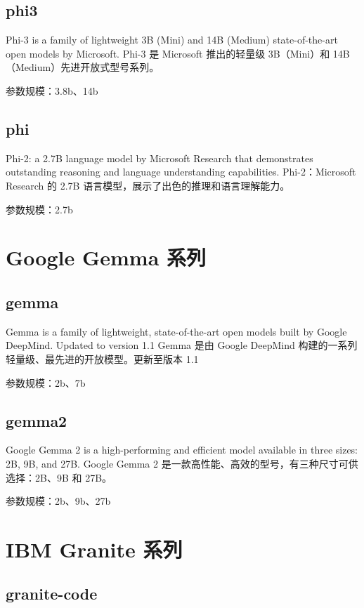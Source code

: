 \documentclass[12pt,UTF8]{ctexbook}
\begin{document}
\subsection{phi3}

Phi-3 is a family of lightweight 3B (Mini) and 14B (Medium) state-of-the-art open models by Microsoft.
Phi-3 是 Microsoft 推出的轻量级 3B（Mini）和 14B（Medium）先进开放式型号系列。

参数规模：3.8b、14b

\subsection{phi}

Phi-2: a 2.7B language model by Microsoft Research that demonstrates outstanding reasoning and language understanding capabilities.
Phi-2：Microsoft Research 的 2.7B 语言模型，展示了出色的推理和语言理解能力。

参数规模：2.7b

\section{Google Gemma 系列}

\subsection{gemma}

Gemma is a family of lightweight, state-of-the-art open models built by Google DeepMind. Updated to version 1.1
Gemma 是由 Google DeepMind 构建的一系列轻量级、最先进的开放模型。更新至版本 1.1

参数规模：2b、7b

\subsection{gemma2}

Google Gemma 2 is a high-performing and efficient model available in three sizes: 2B, 9B, and 27B.
Google Gemma 2 是一款高性能、高效的型号，有三种尺寸可供选择：2B、9B 和 27B。

参数规模：2b、9b、27b

\section{IBM Granite 系列}

\subsection{granite-code}
\end{document}
